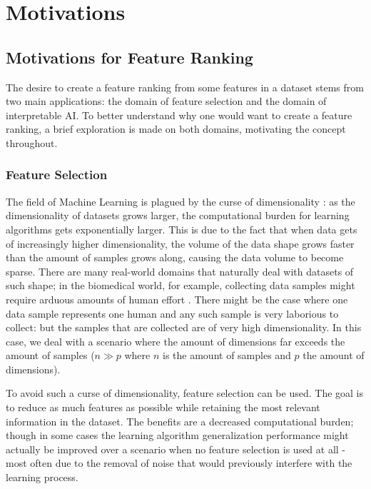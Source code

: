\documentclass[../main.tex]{subfiles}
\begin{document}
\section{Motivations}


\subsection{Motivations for Feature Ranking}\label{section:motivations}
The desire to create a feature ranking from some features in a dataset stems from two main applications: the domain of feature selection and the domain of interpretable AI. To better understand why one would want to create a feature ranking, a brief exploration is made on both domains, motivating the concept throughout.



\subsubsection{Feature Selection}
The field of Machine Learning is plagued by the curse of dimensionality \citep{koppen_curse_2009}: as the dimensionality of datasets grows larger, the computational burden for learning algorithms gets exponentially larger. This is due to the fact that when data gets of increasingly higher dimensionality, the volume of the data shape grows faster than the amount of samples grows along, causing the data volume to become sparse.
There are many real-world domains that naturally deal with datasets of such shape; in the biomedical world, for example, collecting data samples might require arduous amounts of human effort \citep{hu_feature_2018}. There might be the case where one data sample represents one human and any such sample is very laborious to collect: but the samples that are collected are of very high dimensionality. In this case, we deal with a scenario where the amount of dimensions far exceeds the amount of samples ($n \gg p$ where $n$ is the amount of samples and $p$ the amount of dimensions).

To avoid such a curse of dimensionality, feature selection can be used. The goal is to reduce as much features as possible while retaining the most relevant information in the dataset. The benefits are a decreased computational burden; though in some cases the learning algorithm generalization performance might actually be improved over a scenario when no feature selection is used at all - most often due to the removal of noise that would previously interfere with the learning process.
\end{document}
